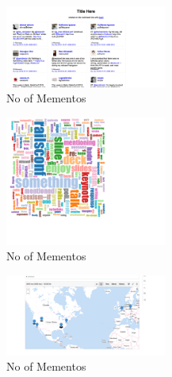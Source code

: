 \documentclass{article}
\begin{document}
\begin{center}
\begin{figure}[ht]
    \centering
    \includegraphics[width=0.475\textwidth,natwidth=700,natheight=700]{day 1 tweet wall.png}
    \caption{No of Mementos}
    \label{fig:day 1 tweet wall.png}
\end{figure}
\end{center}

\begin{center}
\begin{figure}[ht]
    \centering
    \includegraphics[width=0.475\textwidth,natwidth=700,natheight=700]{day 1 tweet wordcloud.png}
    \caption{No of Mementos}
    \label{fig:day 1 tweet wordcloud.png}
\end{figure}
\end{center}

\begin{center}
\begin{figure}[ht]
    \centering
    \includegraphics[width=0.475\textwidth,natwidth=700,natheight=700]{day 1 tweet geojson.png}
    \caption{No of Mementos}
    \label{fig:day 1 tweet geojson.png}
\end{figure}
\end{center}

\clearpage
\end{document}

